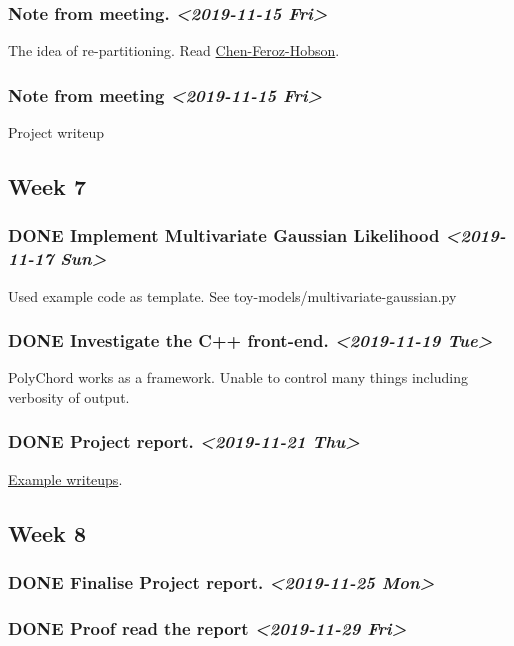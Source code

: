 \documentclass[11pt]{article}
\begin{document}
\subsubsection{Note from meeting. \textit{<2019-11-15 Fri>}}
\label{sec:orgb18bc89}
The idea of re-partitioning. Read \href{https://arxiv.org/pdf/1908.04655.pdf}{Chen-Feroz-Hobson}. 
\subsubsection{Note from meeting \textit{<2019-11-15 Fri>}}
\label{sec:org32cd9ed}
Project writeup

\subsection{Week 7}
\label{sec:org0a9dce2}

\subsubsection{{\bfseries\sffamily DONE} Implement Multivariate Gaussian Likelihood \textit{<2019-11-17 Sun>}}
\label{sec:org73446d8}
Used example code as template. 
See toy-models/multivariate-gaussian.py
\subsubsection{{\bfseries\sffamily DONE} Investigate the C++ front-end. \textit{<2019-11-19 Tue>}}
\label{sec:orgad88b0a}
PolyChord works as a framework. Unable to control many things
including verbosity of output. 
\subsubsection{{\bfseries\sffamily DONE} Project report. \textit{<2019-11-21 Thu>}}
\label{sec:org1bbe26e}
\href{http://www.mrao.cam.ac.uk/\~wh260/Galileo/ }{Example writeups}.
\subsection{Week 8}
\label{sec:org37e8a2a}
\subsubsection{{\bfseries\sffamily DONE} Finalise Project report. \textit{<2019-11-25 Mon>}}
\label{sec:orge13211c}
\subsubsection{{\bfseries\sffamily DONE} Proof read the report \textit{<2019-11-29 Fri>}}
\label{sec:org78fe47f}
\end{document}
